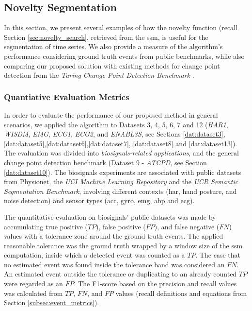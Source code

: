 \subsection{Novelty Segmentation}

In this section, we present several examples of how the novelty function (recall Section \ref{sec:novelty_search}, retrieved from the \gls{ssm}, is useful for the segmentation of time series. We also provide a measure of the algorithm's performance considering ground truth events from public benchmarks, while also comparing our proposed solution with existing methods for change point detection from the \textit{Turing Change Point Detection Benchmark} \cite{cpd_alan}. 

\subsubsection{Quantiative Evaluation Metrics}

In order to evaluate the performance of our proposed method in general scenarios, we applied the algorithm to Datasets 3, 4, 5, 6, 7 and 12 (\textit{HAR1}, \textit{WISDM}, \textit{EMG}, \textit{ECG1}, \textit{ECG2}, and \textit{ENABL3S}, see Sections \ref{dat:dataset3}, \ref{dat:dataset5},\ref{dat:dataset6},\ref{dat:dataset7}, \ref{dat:dataset8} and \ref{dat:dataset13}). The evaluation was divided into \textit{biosignals-related applications}, and the general change point detection benchmark (Dataset 9 - \textit{ATCPD}, see Section \ref{dat:dataset10}). The biosignals experiments are associated with public datasets from Physionet, the \textit{UCI Machine Learning Repository} and the \textit{UCR Semantic Segmentation Benchmark}, involving different contexts (\gls{har}, hand posture, and noise detection) and sensor types (\gls{acc}, \gls{gyro}, \gls{emg}, \gls{abp} and \gls{ecg}).

The quantitative evaluation on biosignals' public datasets was made by accumulating true positive ($TP$), false positive ($FP$), and false negative ($FN$) values with a tolerance zone around the ground truth events. The applied reasonable tolerance was the ground truth wrapped by a window size of the \gls{ssm} computation, inside which a detected event was counted as a $TP$. The case that no estimated event was found inside the tolerance band was considered an $FN$. An estimated event outside the tolerance or duplicating to an already counted $TP$ were regarded as an $FP$. The F1-score based on the precision and recall values was calculated from $TP$, $FN$, and $FP$ values (recall definitions and equations from Section \ref{subsec:event_metrics}).

